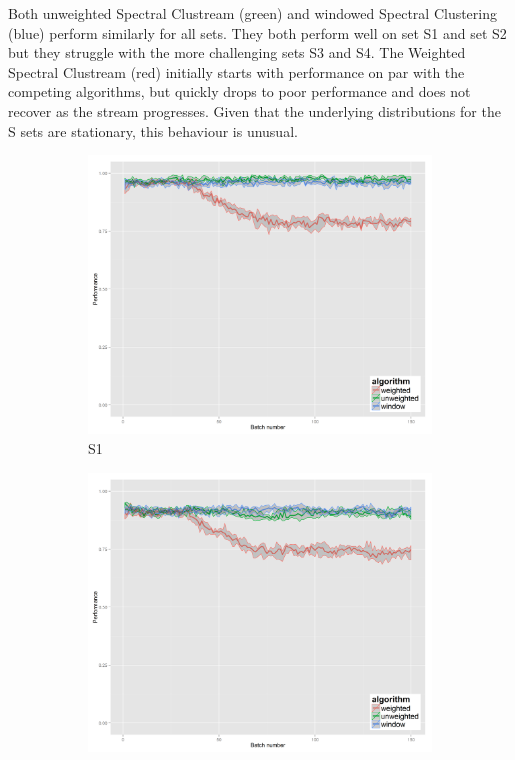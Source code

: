 Both unweighted Spectral Clustream (green) and windowed Spectral  Clustering (blue) perform similarly for all sets.  They both perform well on set S1 and set S2 but they struggle with the more challenging sets S3 and S4.   The Weighted Spectral Clustream (red) initially starts with performance on par with the competing algorithms, but quickly drops to poor performance and does not recover as the stream progresses. Given that the underlying distributions for the S sets are stationary, this behaviour is unusual.

\begin{figure}[H]
\begin{subfigure}{.45\textwidth}
  \centering
  \includegraphics[width=.9\linewidth]{s_set/s_set_1_ci_one_size_vmeasure.png}
  \caption{S1}
\end{subfigure}%
\begin{subfigure}{.45\textwidth}
  \centering
  \includegraphics[width=.9\linewidth]{s_set/s_set_2_ci_one_size_vmeasure.png}

\end{subfigure}
\end{figure}
